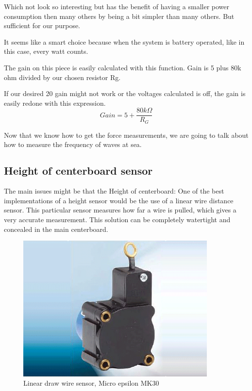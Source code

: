 Which not look so interesting but has the benefit of having a smaller power consumption then many others by being a bit simpler than many others. But sufficient for our purpose.

It seems like a smart choice because when the system is battery operated, like in this case, every watt counts.

The gain on this piece is easily calculated with this function. Gain is 5 plus 80k ohm divided by our chosen resistor Rg. %



If our desired 20 gain might not work or the voltages calculated is off, the gain is easily redone with this expression. %
\begin{equation}%
Gain = 5 + \frac{80k\Omega}{R_G}
\end{equation}


Now that we know how to get the force measurements, we are going to talk about how to measure the frequency of waves at sea.


\subsection{Height of centerboard sensor}

The main issues might be that the Height of centerboard: %
One of the best implementations of a height sensor would be the use of a linear wire distance sensor. This particular sensor measures how far a wire is pulled, which gives a very accurate measurement. This solution can be completely watertight and concealed in the main centerboard.  

\begin{figure}[H]%
\begin{center}
	\includegraphics[width = 10cm]{Figures/microepsilon_mk30.png}
	\caption{Linear draw wire sensor, Micro epsilon MK30}
	\label{Draw_sensor}
\end{center}
\end{figure}
 
